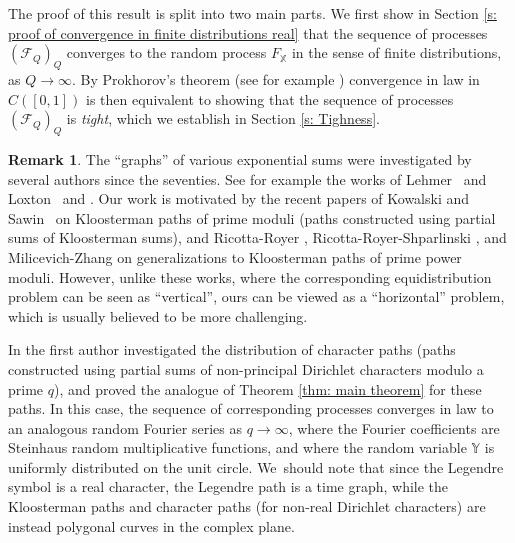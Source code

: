 \documentclass[10pt]{amsart}
\theoremstyle{plain}
\theoremstyle{definition}
\newtheorem{rem}[thm]{Remark}
\newcommand{\X}{\mathbb{X}}
\newcommand{\Y}{\mathbb{Y}}
\begin{document}
The proof of this result is split into two main parts. We first show in Section \ref{s: proof of convergence in finite distributions real} that the sequence of processes $(\mathcal{F}_Q)_Q$ converges to the random process $F_{\X}$ in the sense of finite distributions, as $Q\to \infty$. By Prokhorov's theorem (see for example \cite[Th.\,5.1]{Bi}) convergence in law in $C([0,1])$ is then equivalent to showing that the sequence of processes $(\mathcal{F}_Q)_Q$ is \emph{tight}, which we establish in Section \ref{s: Tighness}.

\begin{rem} The ``graphs'' of various exponential sums were investigated by several authors since the seventies. See for example the works of Lehmer~\cite{Le} and Loxton~\cite{Lo1} and \cite{Lo2}.
Our work is motivated by the recent papers of Kowalski and Sawin~\cite{KoSa} on Kloosterman paths of prime moduli (paths constructed using partial sums of Kloosterman sums), and Ricotta-Royer \cite{RiRo}, Ricotta-Royer-Shparlinski \cite{RiRoSh}, and Milicevich-Zhang \cite{MiZh} on generalizations to Kloosterman paths of prime power moduli. However, unlike these works, where the corresponding equidistribution problem can be seen as ``vertical'', ours can be viewed as a ``horizontal'' problem, which is usually believed to be more challenging.

In \cite{Hu} the first author investigated the distribution of character paths (paths constructed using partial sums of non-principal Dirichlet characters modulo a prime $q$), and proved the analogue of Theorem \ref{thm: main theorem} for these paths. In this case, the sequence of corresponding processes converges in law to an analogous random Fourier series as $q\to \infty$, where the Fourier coefficients are Steinhaus random multiplicative functions, and where the random variable $\Y$ is uniformly distributed on the unit circle. We~should note that since the Legendre symbol is a real character, the Legendre path is a time graph, while the Kloosterman paths and character paths (for non-real Dirichlet characters) are instead polygonal curves in the complex plane.
\end{rem}
\end{document}
